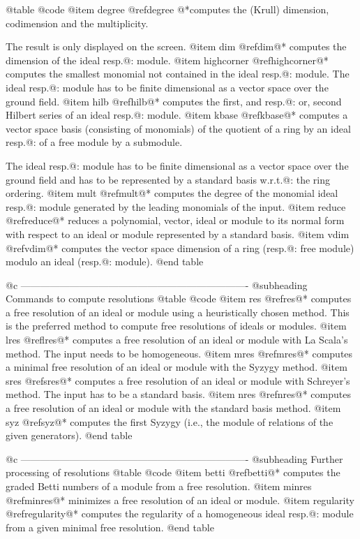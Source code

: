 @table @code
@item degree
@ref{degree}
@*computes the (Krull) dimension, codimension and the multiplicity.

The result is only displayed on the screen.
@item dim
@ref{dim}@*
computes the dimension of the ideal resp.@: module.
@item highcorner
@ref{highcorner}@*
computes the smallest monomial not contained in the ideal resp.@: module.
The ideal resp.@: module has to be finite dimensional as a vector space
over the ground field.
@item hilb
@ref{hilb}@*
computes the first, and resp.@: or, second Hilbert series of an ideal
resp.@: module.
@item kbase
@ref{kbase}@* computes a vector space basis (consisting of monomials) of
the quotient of a ring by an ideal resp.@: of a free module by a
submodule.

The ideal resp.@: module has to be finite dimensional as a vector space
over the ground field and has to be represented by a standard basis w.r.t.@:
the ring ordering.
@item mult
@ref{mult}@*
computes the degree of the monomial ideal resp.@: module generated by
the leading monomials of the input.
@item reduce
@ref{reduce}@*
reduces a polynomial, vector, ideal or module to its normal form with
respect to an ideal or module represented by a standard basis.
@item vdim
@ref{vdim}@*
computes the vector space dimension of a ring (resp.@: free module)
modulo an ideal (resp.@: module).
@end table

@c ----------------------------------------------------------------------
@subheading Commands to compute resolutions
@table @code
@item res
@ref{res}@*
computes a free resolution of an ideal or module using a heuristically
chosen method.
This is the preferred method to compute free resolutions of ideals or
modules.
@item lres
@ref{lres}@*
computes a free resolution of an ideal or module with La Scala's
method. The input needs to be homogeneous.
@item mres
@ref{mres}@*
computes a minimal free resolution of an ideal or module with the Syzygy
method.
@item sres
@ref{sres}@*
computes a free resolution of an ideal or module with Schreyer's
method. The input has to be a standard basis.
@item nres
@ref{nres}@*
computes a free resolution of an ideal or module with the standard basis
method.
@item syz
@ref{syz}@*
computes the first Syzygy (i.e., the module of relations of the
given generators).
@end table

@c ----------------------------------------------------------------------
@subheading Further processing of resolutions
@table @code
@item betti
@ref{betti}@*
computes the graded Betti numbers of a module from a free resolution.
@item minres
@ref{minres}@*
minimizes a free resolution of an ideal or module.
@item regularity
@ref{regularity}@*
computes the regularity of a homogeneous ideal resp.@: module from a given
minimal free resolution.
@end table

